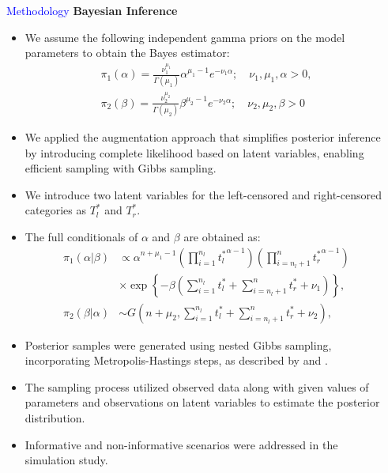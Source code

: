 \documentclass[final]{beamer}
\newlength{\sepwidth}
\newlength{\colwidth}
\newcommand{\separatorcolumn}{\begin{column}{\sepwidth}\end{column}}
\begin{document}
\begin{frame}[t]
\begin{columns}[t]
\begin{column}{\colwidth}
\begin{block}{\textcolor{blue}{Methodology}}
\textbf{Bayesian Inference}
\begin{itemize}
    \item We assume the following independent gamma priors on the model parameters to obtain the Bayes estimator:
   \begin{align*}
	\pi_1(\alpha) = \frac{\nu_1^{\mu_1}}{\Gamma(\mu_1)} \alpha^{\mu_1 - 1} e^{-\nu_1 \alpha}; \quad \nu_1, \mu_1, \alpha > 0 \nonumber,  \\
	 \pi_2(\beta) = \frac{\nu_2^{\mu_2}}{\Gamma(\mu_2)} \beta^{\mu_2 - 1} e^{-\nu_2 \alpha}; \quad \nu_2, \mu_2, \beta > 0 
\end{align*}
\item We applied the augmentation approach that simplifies posterior inference by introducing complete likelihood based on latent variables, enabling efficient sampling with Gibbs sampling.
\vspace{1mm}
\item We introduce two latent variables for the left-censored and right-censored categories as $T_{l}^{*}$ and $T_{r}^{*}$. 
\vspace{1mm}
\item The full conditionals of $\alpha$ and $\beta$ are obtained as:
\begin{align}
     \pi_1(\alpha | \beta) &\propto \alpha^{n+\mu_1-1} \left(\prod_{i=1}^{n_l} {t^*_l}^{\alpha - 1}\right) \left(\prod_{i=n_l+1}^{n} {t^*_r}^{\alpha - 1}\right) \nonumber \\
     &\times \exp\left\{-\beta \left( \sum_{i=1}^{n_l} t^*_l + \sum_{i=n_l+1}^{n} t^*_r  + \nu_1\right)\right\}, \label{eq:alpha_conditional}\\
	\pi_2(\beta | \alpha) &\sim G\left(n + \mu_2, \sum_{i=1}^{n_l} t^*_l + \sum_{i=n_l+1}^{n} t^*_r + \nu_2\right), \label{eq:beta_conditional}	
\end{align}
\end{itemize}

\begin{itemize}
    \item Posterior samples were generated using nested Gibbs sampling, incorporating Metropolis-Hastings steps, as described by \cite{metropolis1949} and \cite{hastings1970}.
    \vspace{1.4mm}
    \item The sampling process utilized observed data along with given values of parameters and observations on latent variables to estimate the posterior distribution.
    \vspace{1.4mm}
    \item Informative and non-informative scenarios were addressed in the simulation study. 
\end{itemize}
  \end{block}
 \end{column}
\separatorcolumn


\end{columns}
\end{frame}
\end{document}
